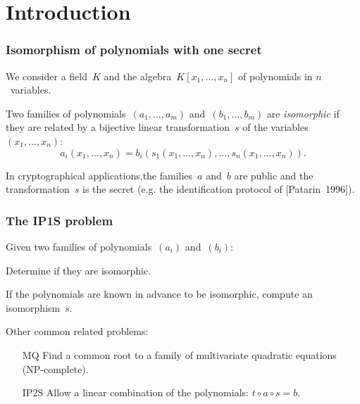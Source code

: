 \documentclass{beamer}%
\def\emphz#1{\emph{{\color{bleu}#1}}}
\begin{document}
\section{Introduction}
\begin{frame}\frametitle{Isomorphism of polynomials with one secret} %

We consider a field~$K$ and the algebra~$K[x_1,…,x_n]$ of polynomials in
$n$~variables.

\begin{definition}
Two families of polynomials~$(a_1, …, a_m)$ and~$(b_1, …, b_m)$
are \emphz{isomorphic} if they are related by a
bijective linear transformation~$s$ of the variables~$(x_1, …, x_n)$:
\[ a_i (x_1, …, x_n) = b_i (s_1 (x_1, …, x_n), …, s_n (x_1, …, x_n)). \]
\end{definition}

In cryptographical applications,the families~$a$ and~$b$ are public and the
transformation~$s$ is the secret (e.g. the identification protocol of
[Patarin~1996]).
\end{frame}%
\begin{frame}\frametitle{The IP1S problem}%

\begin{df}
Given two families of polynomials~$(a_i)$ and~$(b_i)$:
\begin{description}[labelwidth=1ex,align=parleft]
\item[Decisional IP1S] Determine if they are isomorphic.
\item[\textbf{Computational IP1S}] If the polynomials are known in
advance to be isomorphic, compute an isomorphism~$s$.
\end{description}
\end{df}

\bigskip
Other common related problems:
\begin{itemize}
\item[MQ] Find a common root to a family of multivariate quadratic
equations (NP-complete).
\item[IP2S] Allow a linear combination of the polynomials: $t ∘ a ∘ s =
b$.
\end{itemize}
\end{frame}%
\end{document}
